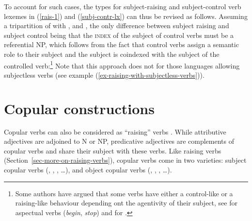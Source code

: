 \noindent
To account for such cases, the types for subject-raising and subject-control verb lexemes in
(\ref{rais-1}) and (\ref{subj-contr-lx}) can thus be revised  as follows. 
Assuming a tripartition of  with ,  and 
\citep[]{ps2}, 
the only difference between subject raising and subject control being that the \textsc{index} of the subject of control verbs must be a
referential NP, which follows from the fact that control verbs assign a semantic role to their
subject and the subject is coindexed with the subject of the controlled verb:\footnote{Some authors have argued that some verbs have either a control-like or a raising-like behaviour depending ont the agentivity of their subject, see  for  aspectual verbs (\emph{begin}, \emph{stop}) and  for .}
\eal
\ex {}  \impl {} 
\ex {} \impl \avm{ [\argst < \NPi, \ldots, [xarg & [ind & $i$ ]  ] > ] }
\zl
Note that this approach does not for those languages allowing subjectless verbs (see example (\ref{ex-raising-with-subjectless-verbs})).

\section{Copular constructions}
\label{sec-copular-constructions}

Copular verbs can also be considered as ``raising'' verbs \citep[]{Chomsky81a}.  While
attributive adjectives are adjoined to N or NP, predicative adjectives are complements of copular
verbs and share their subject with these verbs. Like raising verbs
(Section~\ref{sec-more-on-raising-verbs}), copular verbs come in two varieties: subject copular
verbs (, , , \ldots), and object copular verbs (,
, , \ldots).

